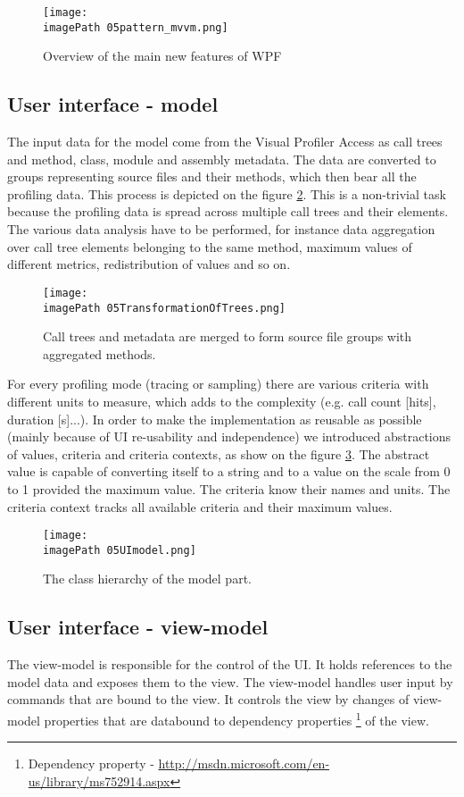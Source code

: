 \begin{figure}
	\centering
		\texttt{[image: \\imagePath 05pattern\_mvvm.png]}
		\caption{Overview of the main new features of WPF \cite{WPFpage}}
	\label{fig:05pattern_mvvm}
\end{figure}

\subsection{User interface - model}
The input data for the model come from the Visual Profiler Access as call trees and method, class, module and assembly metadata. The data are converted to groups representing source files and their methods, which then bear all the profiling data. This process is depicted on the figure \ref{fig:05TransformationOfTrees}. This is a non-trivial task because the profiling data is spread across multiple call trees and their elements. The various data analysis have to be performed, for instance data aggregation over call tree elements belonging to the same method, maximum values of different metrics, redistribution of values and so on.

 \begin{figure}
	\centering
		\texttt{[image: \\imagePath 05TransformationOfTrees.png]}
		\caption{Call trees and metadata are merged to form source file groups with aggregated methods.}
	\label{fig:05TransformationOfTrees}
\end{figure}

For every profiling mode (tracing or sampling) there are various criteria with different units to measure, which adds to the complexity (e.g. call count [hits], duration [s]...). In order to make the implementation as reusable as possible (mainly because of UI re-usability and independence) we introduced abstractions of values, criteria and criteria contexts, as show on the figure \ref{fig:05UImodel}. The abstract value is capable of converting itself to a string and to a value on the scale from 0 to 1 provided the maximum value. The criteria know their names and units. The criteria context tracks all available criteria and their maximum values. 

 \begin{figure}
	\centering
		\texttt{[image: \\imagePath 05UImodel.png]}
		\caption{The class hierarchy of the model part.}
	\label{fig:05UImodel}
\end{figure}

\subsection{User interface - view-model}
The view-model is responsible for the control of the UI. It holds references to the model data and exposes them to the view. The view-model handles user input by commands that are bound to the view. It controls the view by changes of view-model properties that are databound to dependency properties \footnote{Dependency property - \href{http://msdn.microsoft.com/en-us/library/ms752914.aspx}{http://msdn.microsoft.com/en-us/library/ms752914.aspx}} of the view.


